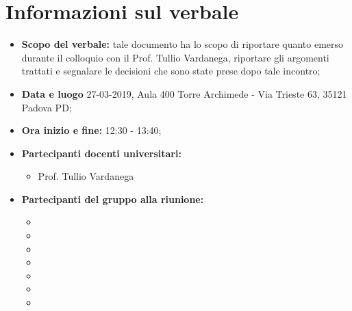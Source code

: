 \clearpage
\section{Informazioni sul verbale}
\label{sec:informazioni}
\begin{itemize}
	\item \textbf {Scopo del verbale:} tale documento ha lo scopo di riportare quanto emerso durante il colloquio con il Prof. Tullio Vardanega, riportare gli argomenti trattati e segnalare le decisioni che sono state prese dopo tale incontro;
	\item \textbf {Data e luogo} 27-03-2019, Aula 400 Torre Archimede - Via Trieste 63, 35121 Padova PD;
	\item \textbf {Ora inizio e fine:} 12:30 - 13:40;
	\item \textbf {Partecipanti docenti universitari:} 
		\begin{itemize}
			\item Prof. Tullio Vardanega
		\end{itemize}
	\item \textbf {Partecipanti del gruppo alla riunione:} 
		 \begin{itemize}
			\item \sonia
			\item \luca
			\item \matteo
			\item \pardeep
			\item \alberto
			\item \alessandro
			\item \andrea
		\end{itemize}
\end{itemize}